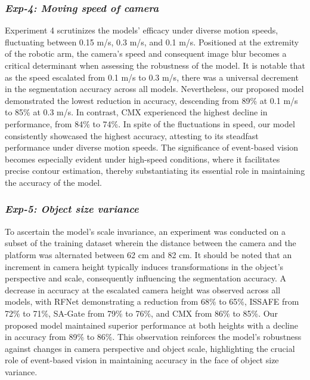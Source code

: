 \documentclass[lettersize,journal]{IEEEtran}
\begin{document}
\subsubsection{\textbf{\textit{Exp-4: Moving speed of camera}}}
\label{subsubsection : speed results}
Experiment 4 scrutinizes the models' efficacy under diverse motion speeds, fluctuating between 0.15 m/s, 0.3 m/s, and 0.1 m/s. Positioned at the extremity of the robotic arm, the camera's speed and consequent image blur becomes a critical determinant when assessing the robustness of the model. It is notable that as the speed escalated from 0.1 m/s to 0.3 m/s, there was a universal decrement in the segmentation accuracy across all models. Nevertheless, our proposed model demonstrated the lowest reduction in accuracy, descending from 89\% at 0.1 m/s to 85\% at 0.3 m/s. In contrast, CMX experienced the highest decline in performance, from  84\% to 74\%. In spite of the fluctuations in speed, our model consistently showcased the highest accuracy, attesting to its steadfast performance under diverse motion speeds. The significance of event-based vision becomes especially evident under high-speed conditions, where it facilitates precise contour estimation, thereby substantiating its essential role in maintaining the accuracy of the model.





\subsubsection{\textbf{\textit{Exp-5: Object size variance}}} 
\label{subsubsection : size variance results}

To ascertain the model's scale invariance, an experiment was conducted on a subset of the training dataset wherein the distance between the camera and the platform was alternated between 62 cm and 82 cm. It should be noted that an increment in camera height typically induces transformations in the object's perspective and scale, consequently influencing the segmentation accuracy. A decrease in accuracy at the escalated camera height was observed across all models, with RFNet demonstrating a reduction from 68\% to 65\%, ISSAFE from 72\% to 71\%, SA-Gate from 79\% to 76\%, and CMX from 86\% to 85\%. Our proposed model maintained superior performance at both heights with a decline in accuracy from 89\% to 86\%. This observation reinforces the model's robustness against changes in camera perspective and object scale, highlighting the crucial role of event-based vision in maintaining accuracy in the face of object size variance.
\end{document}
